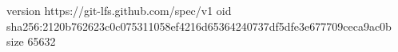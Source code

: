 version https://git-lfs.github.com/spec/v1
oid sha256:2120b762623c0c075311058ef4216d65364240737df5dfe3e677709ceca9ac0b
size 65632
